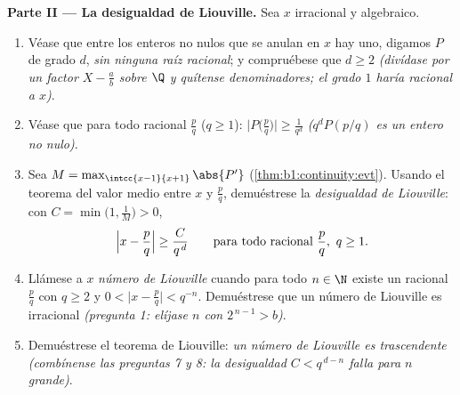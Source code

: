 \begin{problem}
\medskip
\noindent\textbf{Parte II --- La desigualdad de Liouville.} Sea $x$
irracional y algebraico.
\begin{enumerate}[resume]
  \item Véase que entre los  enteros no nulos que se
        anulan en $x$ hay uno, digamos $P$ de grado $d$, \emph{sin
        ninguna raíz racional}; y compruébese que $d \geq 2$
        \emph{(divídase por un factor $X - \frac ab$ sobre $\Q$ y
        quítense denominadores; el grado $1$ haría racional a $x$)}.
  \item Véase que para todo racional $\frac pq$ ($q \geq 1$):
        $\bigl|P\bigl(\frac pq\bigr)\bigr| \geq \frac{1}{q^d}$
        \emph{($q^d P(p/q)$ es un entero no nulo)}.
  \item Sea $M = \max_{\intcc{x-1}{x+1}} \abs{P'}$
        (\cref{thm:b1:continuity:evt}). Usando el teorema del valor
        medio entre $x$ y $\frac pq$, demuéstrese la
        \emph{desigualdad de Liouville}: con
        $C = \min\bigl(1, \frac 1M\bigr) > 0$,
        \[
        \Bigl| x - \frac pq \Bigr| \geq \frac{C}{q^{\,d}}
        \qquad\text{para todo racional } \frac pq,\ q \geq 1 .
        \]
  \item Llámese a $x$ \emph{número de Liouville} cuando para todo
        $n \in \N$ existe un racional $\frac pq$ con $q \geq 2$ y
        $0 < \bigl|x - \frac pq\bigr| < q^{-n}$. Demuéstrese que un
        número de Liouville es irracional \emph{(pregunta 1: elíjase
        $n$ con $2^{\,n-1} > b$)}.
  \item Demuéstrese el teorema de Liouville: \emph{un número de
        Liouville es trascendente} \emph{(combínense las preguntas 7
        y 8: la desigualdad $C < q^{\,d-n}$ falla para $n$ grande)}.
\end{enumerate}


\end{problem}
